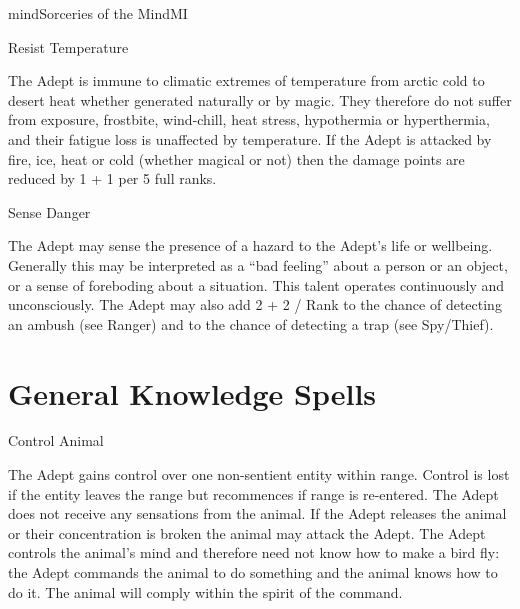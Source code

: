\begin{College}[1.6]{mind}{Sorceries of the Mind}{MI}
\begin{talent}[T-2]{Resist Temperature}

\begin{effects}
The Adept is immune to climatic extremes of temperature from arctic
cold to desert heat whether generated naturally or by magic.  They
therefore do not suffer from exposure, frostbite, wind-chill, heat
stress, hypothermia or hyperthermia, and their fatigue loss is
unaffected by temperature.  If the Adept is attacked by fire, ice,
heat or cold (whether magical or not) then the damage points are
reduced by 1 + 1 per 5 full ranks.
\end{effects}
\end{talent}

\begin{talent}[T-3]{Sense Danger}

\begin{effects}
The Adept may sense the presence of a hazard to the Adept’s life or
wellbeing.  Generally this may be interpreted as a “bad feeling” about
a person or an object, or a sense of foreboding about a situation.
This talent operates continuously and unconsciously.  The Adept may
also add 2 + 2 / Rank to the chance of detecting an ambush (see
Ranger) and to the chance of detecting a trap (see Spy/Thief).
\end{effects}
\end{talent}

\section{General Knowledge Spells}

\begin{spell}[G-1]{Control Animal}

\begin{effects}
The Adept gains control over one non-sentient entity within range.
Control is lost if the entity leaves the range but recommences if
range is re-entered.  The Adept does not receive any sensations from
the animal.  If the Adept releases the animal or their concentration
is broken the animal may attack the Adept.  The Adept controls the
animal’s mind and therefore need not know how to make a bird fly: the
Adept commands the animal to do something and the animal knows how to
do it.  The animal will comply within the spirit of the command.
\end{effects}
\end{spell}


\end{College}

